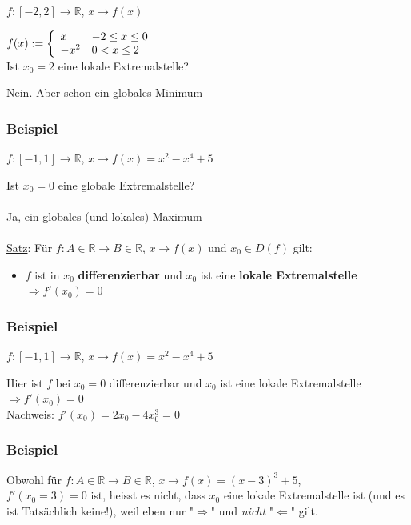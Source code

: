 \documentclass[11pt]{article} %
\begin{document}
$f: [-2,2] \rightarrow \mathbb{R}$, $x\rightarrow f(x)$

$f(x) := \left \{ 
\begin{array}{l  l}
	x & -2\leq x\leq0\\
	-x^2 & 0< x \leq 2\\
	\end{array} \right.$ \\

Ist $x_0=2$ eine lokale Extremalstelle?

Nein. Aber schon ein globales Minimum


\subsubsection{Beispiel}

$f: [-1,1] \rightarrow \mathbb{R}$, $x\rightarrow f(x) = x^2-x^4+5$
 
Ist $x_0 = 0$ eine globale Extremalstelle?
\\\\
Ja, ein globales (und lokales) Maximum\\\\

\underline{Satz}: Für $f: A \in \mathbb{R} \rightarrow B \in \mathbb{R}$, $x \rightarrow f(x)$ und $x_0\in D(f)$ gilt:
\begin{itemize}
\item $f$ ist in $x_0$ {\bf differenzierbar} und $x_0$ ist eine {\bf lokale Extremalstelle} \\ $\Rightarrow f'(x_0) = 0$
\end{itemize}

\subsubsection{Beispiel}

$f: [-1,1] \rightarrow \mathbb{R}$, $x\rightarrow f(x) = x^2-x^4+5$

Hier ist $f$ bei $x_0 = 0$ differenzierbar und $x_0$ ist eine lokale Extremalstelle $\Rightarrow f'(x_0) = 0$\\

Nachweis: $f'(x_0) = 2x_0 - 4x_0^3 = 0$

\subsubsection{Beispiel}

Obwohl für $f: A \in \mathbb{R} \rightarrow B \in \mathbb{R}$, $x \rightarrow f(x) = (x-3)^3 + 5$,\\ $f'(x_0=3) = 0$ ist, heisst es nicht, dass $x_0$ eine lokale Extremalstelle ist (und es ist Tatsächlich keine!), weil eben nur "$\Rightarrow$" und \emph{nicht} "$\Leftarrow$" gilt.\\
\end{document}
